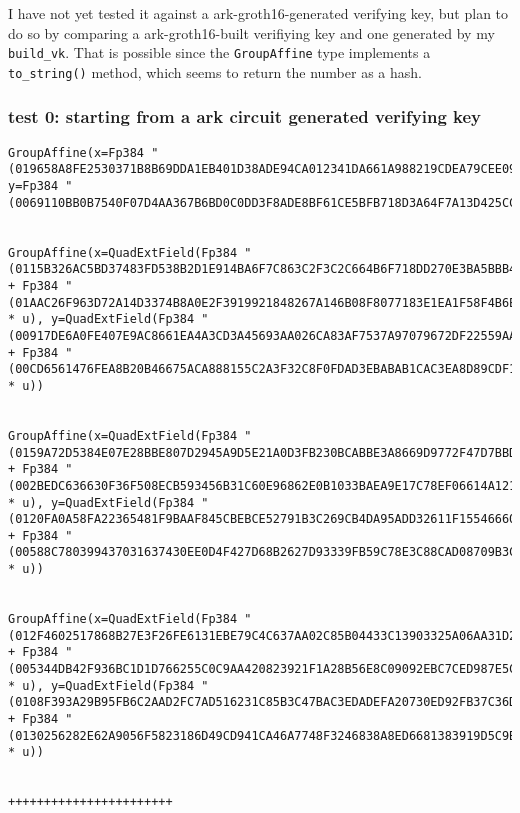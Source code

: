 \documentclass{article}
\newcommand{\inl}[1]{\lstinline{#1}}
\begin{document}
I have not yet tested it against a ark-groth16-generated verifying key, but plan to do so by comparing a ark-groth16-built verifiying key and one generated by my \inl{build_vk}. That is possible since the \inl{GroupAffine} type implements a \inl{to_string()} method, which seems to return the number as a hash.

\subsubsection{test 0: starting from a ark circuit generated verifying key}

\begin{lstlisting}
GroupAffine(x=Fp384 "(019658A8FE2530371B8B69DDA1EB401D38ADE94CA012341DA661A988219CDEA79CEE092B535FF84E71C2A9A18957B881)", y=Fp384 "(0069110BB0B7540F07D4AA367B6BD0C0DD3F8ADE8BF61CE5BFB718D3A64F7A13D425CC898EA11DCF59A065EEEDF0BB80)")


GroupAffine(x=QuadExtField(Fp384 "(0115B326AC5BD37483FD538B2D1E914BA6F7C863C2F3C2C664B6F718DD270E3BA5BBB456B5DB9EE53A190F79D4C6EC07)" + Fp384 "(01AAC26F963D72A14D3374B8A0E2F3919921848267A146B08F8077183E1EA1F58F4B6E716832254C54CD4B784BB63046)" * u), y=QuadExtField(Fp384 "(00917DE6A0FE407E9AC8661EA4A3CD3A45693AA026CA83AF7537A97079672DF22559AABA58FF1AA657F8F628600C520D)" + Fp384 "(00CD6561476FEA8B20B46675ACA888155C2A3F32C8F0FDAD3EBABAB1CAC3EA8D89CDF16A4D559A727E5BDBAFFD27D357)" * u))


GroupAffine(x=QuadExtField(Fp384 "(0159A72D5384E07E28BBE807D2945A9D5E21A0D3FB230BCABBE3A8669D9772F47D7BBDE56225D0C06D93416604C42CA0)" + Fp384 "(002BEDC636630F36F508ECB593456B31C60E96862E0B1033BAEA9E17C78EF06614A1211BA2A1FA49918B4F30260BB2B9)" * u), y=QuadExtField(Fp384 "(0120FA0A58FA22365481F9BAAF845CBEBCE52791B3C269CB4DA95ADD32611F1554666058A28452CC1ED42DFB7CB0FFC2)" + Fp384 "(00588C780399437031637430EE0D4F427D68B2627D93339FB59C78E3C88CAD08709B3CBF99303E8B7E25286DA29F9C6C)" * u))


GroupAffine(x=QuadExtField(Fp384 "(012F4602517868B27E3F26FE6131EBE79C4C637AA02C85B04433C13903325A06AA31D2B311D5C95A75C4A92143F46DB7)" + Fp384 "(005344DB42F936BC1D1D766255C0C9AA420823921F1A28B56E8C09092EBC7CED987E5C6E0C5C4B61522556656467EF25)" * u), y=QuadExtField(Fp384 "(0108F393A29B95FB6C2AAD2FC7AD516231C85B3C47BAC3EDADEFA20730ED92FB37C36D054A217C0EB39015B5F0490A5B)" + Fp384 "(0130256282E62A9056F5823186D49CD941CA46A7748F3246838A8ED6681383919D5C9BFD4EE89B8D48C960A93227A723)" * u))


+++++++++++++++++++++++


\end{lstlisting}
\end{document}

